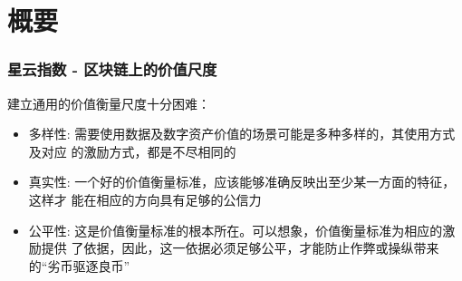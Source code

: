 
\section{概要}
\begin{frame}
	\frametitle{星云指数 - 区块链上的价值尺度}
  建立通用的价值衡量尺度十分困难：
  \begin{itemize}[<+->]
  \item 多样性: 需要使用数据及数字资产价值的场景可能是多种多样的，其使用方式及对应 的激励方式，都是不尽相同的
  \item 真实性: 一个好的价值衡量标准，应该能够准确反映出至少某一方面的特征，这样才 能在相应的方向具有足够的公信力
  \item 公平性: 这是价值衡量标准的根本所在。可以想象，价值衡量标准为相应的激励提供 了依据，因此，这一依据必须足够公平，才能防止作弊或操纵带来的“劣币驱逐良币”
  \end{itemize}
\end{frame}
